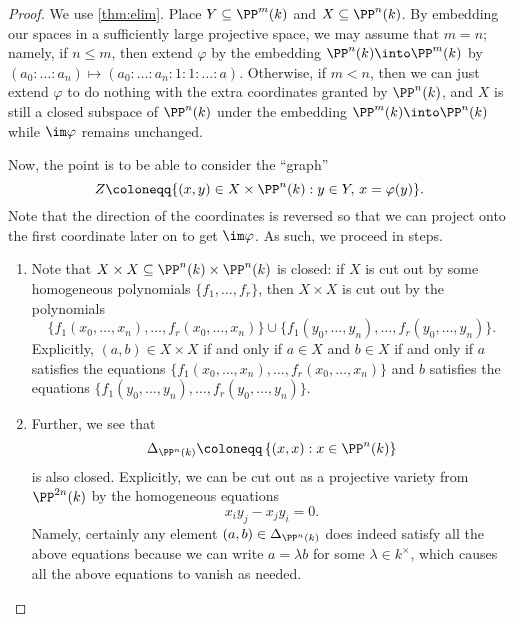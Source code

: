\begin{proof}
	We use \autoref{thm:elim}. Place $Y\subseteq\PP^m(k)$ and $X\subseteq\PP^n(k)$. By embedding our spaces in a sufficiently large projective space, we may assume that $m=n$; namely, if $n\le m$, then extend $\varphi$ by the embedding $\PP^n(k)\into\PP^m(k)$ by $(a_0:\ldots:a_n)\mapsto(a_0:\ldots:a_n:1:1:\ldots:a)$. Otherwise, if $m<n$, then we can just extend $\varphi$ to do nothing with the extra coordinates granted by $\PP^n(k)$, and $X$ is still a closed subspace of $\PP^n(k)$ under the embedding $\PP^m(k)\into\PP^n(k)$ while $\im\varphi$ remains unchanged.
	
	Now, the point is to be able to consider the ``graph''
	\[Z\coloneqq\{(x,y)\in X\times\PP^n(k):y\in Y,\,x=\varphi(y)\}.\]
	Note that the direction of the coordinates is reversed so that we can project onto the first coordinate later on to get $\im\varphi$. As such, we proceed in steps.
	\begin{enumerate}
		\item Note that $X\times X\subseteq\PP^n(k)\times\PP^n(k)$ is closed: if $X$ is cut out by some homogeneous polynomials $\{f_1,\ldots,f_r\}$, then $X\times X$ is cut out by the polynomials
		\[\{f_1(x_0,\ldots,x_n),\ldots,f_r(x_0,\ldots,x_n)\}\cup\{f_1(y_0,\ldots,y_n),\ldots,f_r(y_0,\ldots,y_n)\}.\]
		Explicitly, $(a,b)\in X\times X$ if and only if $a\in X$ and $b\in X$ if and only if $a$ satisfies the equations $\{f_1(x_0,\ldots,x_n),\ldots,f_r(x_0,\ldots,x_n)\}$ and $b$ satisfies the equations $\{f_1(y_0,\ldots,y_n),\ldots,f_r(y_0,\ldots,y_n)\}$.
		\item Further, we see that
		\[\Delta_{\PP^n(k)}\coloneqq\left\{(x,x):x\in\PP^n(k)\right\}\]
		is also closed. Explicitly, we can be cut out as a projective variety from $\PP^{2n}(k)$ by the homogeneous equations
		\[x_iy_j-x_jy_i=0.\]
		Namely, certainly any element $(a,b)\in\Delta_{\PP^n(k)}$ does indeed satisfy all the above equations because we can write $a=\lambda b$ for some $\lambda\in k^\times$, which causes all the above equations to vanish as needed.


\end{enumerate}
\end{proof}
